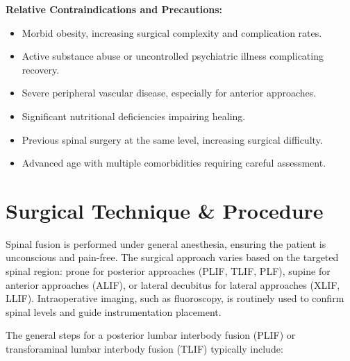 \textbf{Relative Contraindications and Precautions:}
\begin{itemize}
  \item Morbid obesity, increasing surgical complexity and complication rates.
  \item Active substance abuse or uncontrolled psychiatric illness complicating recovery.
  \item Severe peripheral vascular disease, especially for anterior approaches.
  \item Significant nutritional deficiencies impairing healing.
  \item Previous spinal surgery at the same level, increasing surgical difficulty.
  \item Advanced age with multiple comorbidities requiring careful assessment.
\end{itemize}

\section*{Surgical Technique \& Procedure}
Spinal fusion is performed under general anesthesia, ensuring the patient is unconscious and pain-free. The surgical approach varies based on the targeted spinal region: prone for posterior approaches (PLIF, TLIF, PLF), supine for anterior approaches (ALIF), or lateral decubitus for lateral approaches (XLIF, LLIF). Intraoperative imaging, such as fluoroscopy, is routinely used to confirm spinal levels and guide instrumentation placement.

The general steps for a posterior lumbar interbody fusion (PLIF) or transforaminal lumbar interbody fusion (TLIF) typically include:

